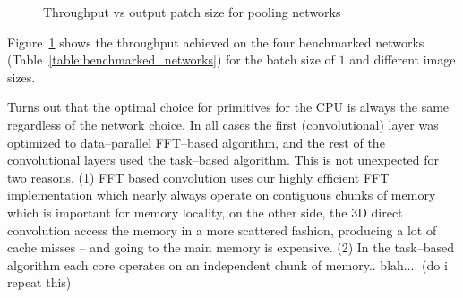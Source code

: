 \documentclass[conference]{IEEEtran}
\begin{document}
  \begin{figure}[h!t]
    \centering %

    \caption{Throughput vs output patch size for pooling networks
    }
    \label{fig:experiments1}
  \end{figure}



  Figure~\ref{fig:experiments1} shows the throughput achieved on the
  four benchmarked networks (Table~\ref{table:benchmarked_networks})
  for the batch size of $1$ and different image sizes.

  Turns out that the optimal choice for primitives for the CPU is
  always the same regardless of the network choice.  In all cases the
  first (convolutional) layer was optimized to data--parallel
  FFT--based algorithm, and the rest of the convolutional layers used
  the task--based algorithm.  This is not unexpected for two
  reasons. (1) FFT based convolution uses our highly efficient FFT
  implementation which nearly always operate on contiguous chunks of
  memory which is important for memory locality, on the other side,
  the 3D direct convolution access the memory in a more scattered
  fashion, producing a lot of cache misses -- and going to the main
  memory is expensive. (2) In the task--based algorithm each core
  operates on an independent chunk of memory.. blah.... (do i repeat
  this)
\end{document}
